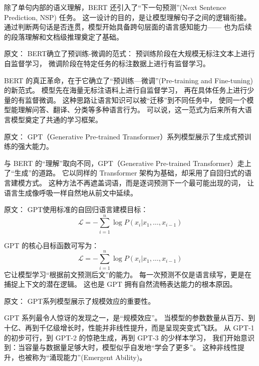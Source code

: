 除了单句内部的语义理解，BERT 还引入了“下一句预测”(Next Sentence Prediction, NSP) 任务。  
这一设计的目的，是让模型理解句子之间的逻辑衔接。  
通过判断两句话是否连贯，模型开始具备跨句层面的语言感知能力——  
也为后续的段落理解和文档级推理奠定了基础。  



原文：
BERT确立了预训练-微调的范式：  
预训练阶段在大规模无标注文本上进行自监督学习，  
微调阶段在特定任务的标注数据上进行有监督学习。  

BERT 的真正革命，在于它确立了“预训练—微调”(Pre-training and Fine-tuning) 的新范式。  
模型先在海量无标注语料上进行自监督学习，  
再在具体任务上进行少量的有监督微调。  
这种思路让语言知识可以被“迁移”到不同任务中，  
使同一个模型能理解问答、翻译、分类等多种语言行为。  
可以说，这一范式为后来所有大语言模型奠定了共通的学习框架。  



原文：
GPT（Generative Pre-trained Transformer）系列模型展示了生成式预训练的强大能力。  

与 BERT 的“理解”取向不同，GPT（Generative Pre-trained Transformer）走上了“生成”的道路。  
它以同样的 Transformer 架构为基础，却采用了自回归式的语言建模方式。  
这种方法不再遮盖词语，而是逐词预测下一个最可能出现的词，  
让语言生成像呼吸一样自然地从前文中延续。  



原文：
GPT使用标准的自回归语言建模目标：  
\[
\mathcal{L} = -\sum_{i=1}^n \log P(x_i | x_1, \ldots, x_{i-1})
\]  

GPT 的核心目标函数可写为：  
\[
\mathcal{L} = -\sum_{i=1}^n \log P(x_i | x_1, \ldots, x_{i-1})
\]  
它让模型学习“根据前文预测后文”的能力。  
每一次预测不仅是语言续写，更是在捕捉上下文的潜在逻辑。  
这也是 GPT 拥有自然流畅表达能力的根本原因。  



原文：
GPT系列模型展示了规模效应的重要性。  

GPT 系列最令人惊讶的发现之一，是“规模效应”。  
当模型的参数数量从百万、到十亿、再到千亿级增长时，性能并非线性提升，而是呈现突变式飞跃。  
从 GPT-1 的初步可行，到 GPT-2 的惊艳生成，再到 GPT-3 的少样本学习，  
我们开始意识到：当容量与数据量足够大时，模型似乎自发地“学会了更多”。  
这种非线性提升，也被称为“涌现能力”(Emergent Ability)。  



